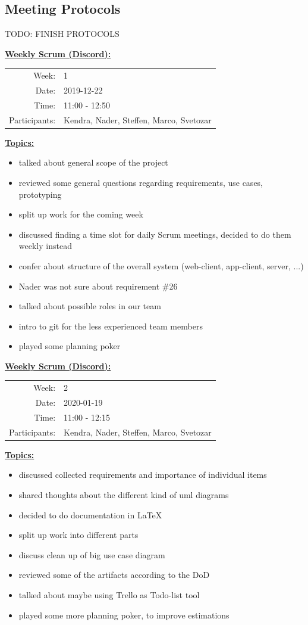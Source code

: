 \documentclass[a4paper, 12pt]{article}
\newcommand{\protocolheader}[5]{
    \vspace{1em}
    \underline{\textbf{#1:}}
    
    \begin{tabular}{rl}
        Week:   & #2\\
        Date:   & #3\\
        Time:   & #4\\
        Participants:   & #5\\
    \end{tabular}
    
    \vspace{1em}
    \underline{\textbf{Topics:}}
}
\begin{document}
\subsection{Meeting Protocols}
\color{red}TODO: FINISH PROTOCOLS\color{black}

\protocolheader{Weekly Scrum (Discord)}{1}{2019-12-22}{11:00 - 12:50}
    {Kendra, Nader, Steffen, Marco, Svetozar}
\begin{itemize}
    \item talked about general scope of the project
    \item reviewed some general questions regarding requirements, use cases, prototyping
    \item split up work for the coming week
    \item discussed finding a time slot for daily Scrum meetings, decided to do them weekly instead
    \item confer about structure of the overall system (web-client, app-client, server, ...)
    \item Nader was not sure about requirement \#26
    \item talked about possible roles in our team
    \item intro to git for the less experienced team members
    \item played some planning poker
\end{itemize}

\protocolheader{Weekly Scrum (Discord)}{2}{2020-01-19}{11:00 - 12:15}
    {Kendra, Nader, Steffen, Marco, Svetozar}
\begin{itemize}
    \item discussed collected requirements and importance of individual items
    \item shared thoughts about the different kind of uml diagrams
    \item decided to do documentation in LaTeX
    \item split up work into different parts
    \item discuss clean up of big use case diagram
    \item reviewed some of the artifacts according to the DoD
    \item talked about maybe using Trello as Todo-list tool
    \item played some more planning poker, to improve estimations
\end{itemize}
\end{document}
